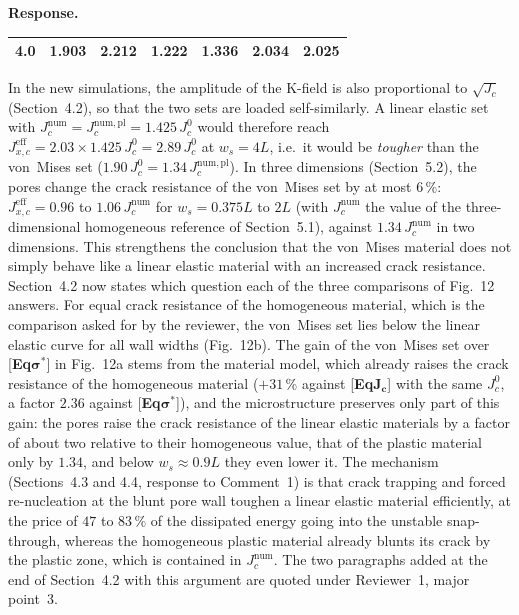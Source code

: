 \documentclass[pdflatex,sn-mathphys-num]{sn-jnl}
\newcommand{\EqJcLabel}{[\textbf{Eq$\boldsymbol{J_c}$}]\xspace}
\newcommand{\EqSigmaStarLabel}{[\textbf{Eq$\boldsymbol{\sigma^*}$}]\xspace}
\newenvironment{response}
  {\par\noindent\textbf{Response.}\ }
  {\par}
\begin{document}
\begin{response}
\begin{center}
\begin{tabular}{lcccccc}
4.0   & 1.903 & 2.212 & 1.222 & 1.336 & 2.034 & 2.025 \\
\bottomrule
\end{tabular}
\end{center} In the new simulations, the amplitude of the K-field is also proportional to $\sqrt{J_c}$ (Section~4.2),
so that the two sets are loaded self-similarly. A linear elastic set with $J_c^{\mathrm{num}} = J_c^{\mathrm{num,pl}} =
1.425\,J_c^0$ would therefore reach $J_{x,c}^{\text{eff}} = 2.03 \times 1.425\,J_c^0 = 2.89\,J_c^0$ at $w_s = 4L$, i.e.\
it would be \emph{tougher} than the von~Mises set ($1.90\,J_c^0 = 1.34\,J_c^{\mathrm{num,pl}}$). In three dimensions
(Section~5.2), the pores change the crack resistance of the von~Mises set by at most $6\,\%$:
$J_{x,c}^{\text{eff}} = 0.96$ to $1.06\,J_c^{\mathrm{num}}$ for $w_s = 0.375L$ to $2L$
(with $J_c^{\mathrm{num}}$ the value of the three-dimensional homogeneous reference of Section~5.1), against $1.34\,J_c^{\mathrm{num}}$ in two dimensions.
This strengthens the conclusion that the von~Mises material does not simply behave like a linear elastic material with
an increased crack resistance. Section~4.2 now states which question each of the three comparisons of Fig.~12 answers.
For equal crack resistance of the homogeneous material, which is the comparison asked for by the reviewer, the
von~Mises set lies below the linear elastic curve for all wall widths (Fig.~12b). The gain of the von~Mises set over
\EqSigmaStarLabel in Fig.~12a stems from the material model, which already raises the crack resistance of the
homogeneous material ($+31\,\%$ against \EqJcLabel with the same $J_c^0$, a factor $2.36$ against \EqSigmaStarLabel),
and the microstructure preserves only part of this gain: the pores raise the crack resistance of the linear elastic
materials by a factor of about two relative to their homogeneous value, that of the plastic material only by $1.34$,
and below $w_s \approx 0.9L$ they even lower it. The mechanism (Sections~4.3 and 4.4, response to Comment~1) is that
crack trapping and forced re-nucleation at the blunt pore wall toughen a linear elastic material efficiently, at the
price of $47$ to $83\,\%$ of the dissipated energy going into the unstable snap-through, whereas the homogeneous
plastic material already blunts its crack by the plastic zone, which is contained in $J_c^{\mathrm{num}}$. The two
paragraphs added at the end of Section~4.2 with this argument are quoted under Reviewer~1, major point~3.
\end{response}
\end{document}

